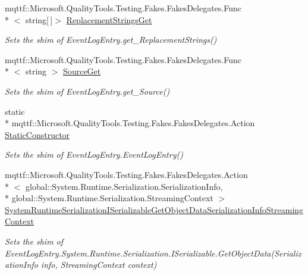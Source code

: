 \begin{DoxyCompactItemize}
mqttf\-::\-Microsoft.\-Quality\-Tools.\-Testing.\-Fakes.\-Fakes\-Delegates.\-Func\\*
$<$ string\mbox{[}$\,$\mbox{]}$>$ \hyperlink{class_system_1_1_diagnostics_1_1_fakes_1_1_shim_event_log_entry_ababa14323927d6a4eb96219cdb78ad6a}{Replacement\-Strings\-Get}
\begin{DoxyCompactList}\small\item\em Sets the shim of Event\-Log\-Entry.\-get\-\_\-\-Replacement\-Strings()\end{DoxyCompactList}\item 
mqttf\-::\-Microsoft.\-Quality\-Tools.\-Testing.\-Fakes.\-Fakes\-Delegates.\-Func\\*
$<$ string $>$ \hyperlink{class_system_1_1_diagnostics_1_1_fakes_1_1_shim_event_log_entry_ad4ab318b6c63e4abfd7596a28b6cbb75}{Source\-Get}
\begin{DoxyCompactList}\small\item\em Sets the shim of Event\-Log\-Entry.\-get\-\_\-\-Source()\end{DoxyCompactList}\item 
static \\*
mqttf\-::\-Microsoft.\-Quality\-Tools.\-Testing.\-Fakes.\-Fakes\-Delegates.\-Action \hyperlink{class_system_1_1_diagnostics_1_1_fakes_1_1_shim_event_log_entry_a3b369359db591c536798b59ef7068820}{Static\-Constructor}
\begin{DoxyCompactList}\small\item\em Sets the shim of Event\-Log\-Entry.\-Event\-Log\-Entry()\end{DoxyCompactList}\item 
mqttf\-::\-Microsoft.\-Quality\-Tools.\-Testing.\-Fakes.\-Fakes\-Delegates.\-Action\\*
$<$ global\-::\-System.\-Runtime.\-Serialization.\-Serialization\-Info, \\*
global\-::\-System.\-Runtime.\-Serialization.\-Streaming\-Context $>$ \hyperlink{class_system_1_1_diagnostics_1_1_fakes_1_1_shim_event_log_entry_a1732ddf20091d125c460b4343d59ce74}{System\-Runtime\-Serialization\-I\-Serializable\-Get\-Object\-Data\-Serialization\-Info\-Streaming\-Context}
\begin{DoxyCompactList}\small\item\em Sets the shim of Event\-Log\-Entry.\-System.\-Runtime.\-Serialization.\-I\-Serializable.\-Get\-Object\-Data(\-Serialization\-Info info, Streaming\-Context context)\end{DoxyCompactList}\item 

\end{DoxyCompactItemize}
